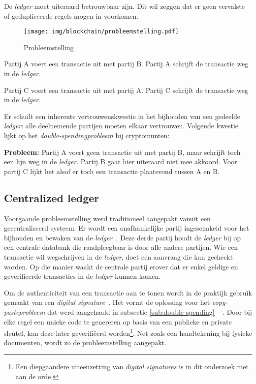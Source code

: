 De \textit{ledger} moet uiteraard betrouwbaar zijn. Dit wil zeggen dat er geen vervalste of gedupliceerde regels mogen in voorkomen.

\begin{figure}[H]
	\centering
	\texttt{[image: img/blockchain/probleemstelling.pdf]}
	\caption{\label{fig:probleemstelling}Probleemstelling}
\end{figure}

\begin{tcolorbox}[title=\textbf{Voorbeeld}, colframe={rgb,255:red,0;green,147;blue,208}, colback={rgb,255:red,247;green,252;blue,254} ]
Partij A voert een transactie uit met partij B. Partij A schrijft de transactie weg in de \textit{ledger}.

Partij C voert een transactie uit met partij A. Partij C schrijft de transactie weg in de \textit{ledger}.
\end{tcolorbox}

Er schuilt een inherente vertrouwenskwestie in het bijhouden van een gedeelde \textit{ledger}: alle deelnemende partijen moeten elkaar vertrouwen. Volgende kwestie lijkt op het \textit{double-spendingprobleem} bij cryptomunten:

\textbf{Probleem:} 
Partij A voert geen transactie uit met partij B, maar schrijft toch een lijn weg in de \textit{ledger}. Partij B gaat hier uiteraard niet mee akkoord. Voor partij C lijkt het alsof er toch een transactie plaatsvond tussen A en B.


\subsection{Centralized ledger}
\label{sub:centralized-ledger}

Voorgaande probleemstelling werd traditioneel aangepakt vanuit een gecentraliseerd systeem. Er wordt een onafhankelijke partij ingeschakeld voor het bijhouden en bewaken van de \textit{ledger}~\autocite{Rawat2020}. Deze derde partij houdt de \textit{ledger} bij op een centrale databank die raadpleegbaar is door alle andere partijen. Wie een transactie wil wegschrijven in de \textit{ledger}, doet een aanvraag die kan gecheckt worden. Op die manier waakt de centrale partij erover dat er enkel geldige en geverifieerde transacties in de \textit{ledger} kunnen komen. 

Om de authenticiteit van een transactie aan te tonen wordt in de praktijk gebruik gemaakt van een \textit{digital signature}~\autocite{Salem2008}. Het vormt de oplossing voor het \textit{copy-pasteprobleem} dat werd aangehaald in subsectie \ref{sub:double-spending} -- . Door bij elke regel een unieke code te genereren op basis van een publieke en private sleutel, kan deze later geverifiëerd worden\footnote{Een diepgaandere uiteenzetting van \textit{digital signatures} is in dit onderzoek niet aan de orde.}. Net zoals een handtekening bij fysieke documenten, wordt zo de probleemstelling aangepakt.

